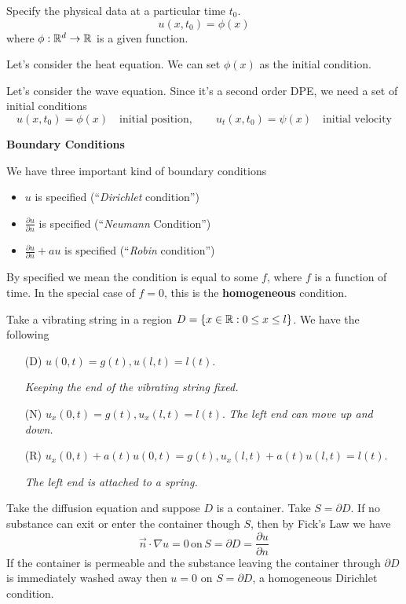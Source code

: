 	Specify the physical data at a particular time $t_0$.
	\[ u(x, t_0) = \phi(x)\]
	where $\phi : \mathbb R^d \to \mathbb R$ is a given function.
	\begin{example}
		Let's consider the heat equation. We can set $\phi(x)$ as the initial condition.

		Let's consider the wave equation. Since it's a second order DPE, we need a set of initial conditions
		\[ u(x, t_0) = \phi(x) \quad\text{initial position}, \qquad u_t(x,t_0) = \psi(x) \quad\text{initial velocity}\]
	\end{example}
\textbf{Boundary Conditions}

	We have three important kind of boundary conditions
	\begin{itemize}
		\item $u$ is specified (``\textit{Dirichlet} condition'')
		\item $\frac{\partial u}{\partial n}$ is specified (``\textit{Neumann} Condition'')
		\item $\frac{\partial u}{\partial n} + au$ is specified (``\textit{Robin} condition'')
	\end{itemize}
	By specified we mean the condition is equal to some $f$, where $f$ is a function of time. In the special case of $f = 0$, this is the \textbf{homogeneous} condition.
	\begin{example}
		Take a vibrating string in a region $D = \left\{ x \in \mathbb R : 0 \leq x \leq l \right\}$. We have the following
		\begin{enumerate}
			\item[(D)] $u(0,t) = g(t), u(l,t) = l(t)$. 

			\textit{Keeping the end of the vibrating string fixed.}
			\item[(N)] $u_x(0,t) = g(t), u_x(l,t) = l(t)$. 
			\textit{The left end can move up and down.}
			\item[(R)] $u_x(0,t) + a(t) u(0,t) = g(t), u_x(l,t) + a(t) u(l,t) = l(t)$.

			\textit{The left end is attached to a spring.}
		\end{enumerate}
	\end{example}
	\begin{example}
		Take the diffusion equation and suppose $D$ is a container. Take $S = \partial D$. If no substance can exit or enter the container though $S$, then by Fick's Law we have
		\[ \vec n \cdot \nabla u = 0 \, \mathrm{on} \, S = \partial D = \frac{\partial u}{\partial n}\]
		If the container is permeable and the substance leaving the container through $\partial D$ is immediately washed away then $u = 0$ on $S = \partial D$, a homogeneous Dirichlet condition.
	\end{example}
